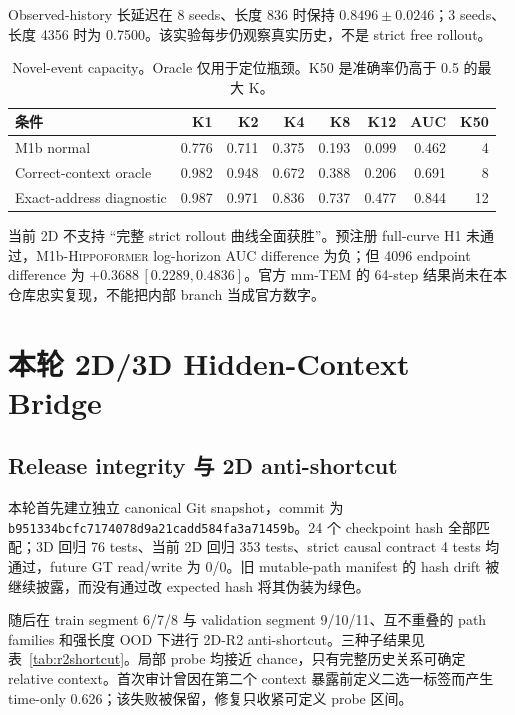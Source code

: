 \documentclass{article}
\newcommand{\base}{\textsc{Hippoformer}}
\begin{document}
Observed-history 长延迟在 8 seeds、长度 836 时保持 $0.8496\pm0.0246$；3 seeds、长度 4356 时为 0.7500。该实验每步仍观察真实历史，不是 strict free rollout。

\begin{table}[H]
\centering
\small
\caption{Novel-event capacity。Oracle 仅用于定位瓶颈。K50 是准确率仍高于 0.5 的最大 K。}
\begin{tabular}{lrrrrrrr}
\toprule
条件 & K1 & K2 & K4 & K8 & K12 & AUC & K50\\
\midrule
M1b normal & 0.776 & 0.711 & 0.375 & 0.193 & 0.099 & 0.462 & 4\\
Correct-context oracle & 0.982 & 0.948 & 0.672 & 0.388 & 0.206 & 0.691 & 8\\
Exact-address diagnostic & 0.987 & 0.971 & 0.836 & 0.737 & 0.477 & 0.844 & 12\\
\bottomrule
\end{tabular}
\end{table}

当前 2D 不支持 ``完整 strict rollout 曲线全面获胜''。预注册 full-curve H1 未通过，M1b-\base{} log-horizon AUC difference 为负；但 4096 endpoint difference 为 $+0.3688\,[0.2289,0.4836]$。官方 mm-TEM 的 64-step 结果尚未在本仓库忠实复现，不能把内部 branch 当成官方数字。

\section{本轮 2D/3D Hidden-Context Bridge}

\subsection{Release integrity 与 2D anti-shortcut}

本轮首先建立独立 canonical Git snapshot，commit 为
\texttt{b951334bcfc7174078d9a21cadd584fa3a71459b}。24 个 checkpoint hash
全部匹配；3D 回归 76 tests、当前 2D 回归 353 tests、strict causal
contract 4 tests 均通过，future GT read/write 为 0/0。旧 mutable-path
manifest 的 hash drift 被继续披露，而没有通过改 expected hash 将其伪装为绿色。

随后在 train segment 6/7/8 与 validation segment 9/10/11、互不重叠的
path families 和强长度 OOD 下进行 2D-R2 anti-shortcut。三种子结果见
表~\ref{tab:r2shortcut}。局部 probe 均接近 chance，只有完整历史关系可确定
relative context。首次审计曾因在第二个 context 暴露前定义二选一标签而产生
time-only 0.626；该失败被保留，修复只收紧可定义 probe 区间。
\end{document}
